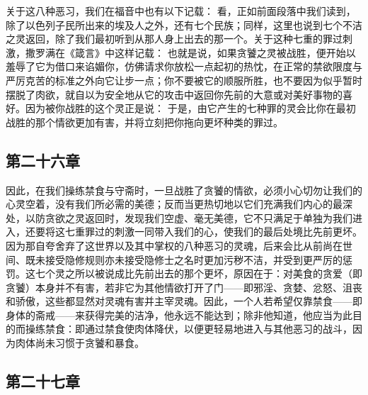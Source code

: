 关于这八种恶习，我们在福音中也有以下记载：  看，正如前面段落中我们读到，除了以色列子民所出来的埃及人之外，还有七个民族；同样，这里也说到七个不洁之灵返回，除了我们最初听到从那人身上出去的那一个。关于这种七重的罪过刺激，撒罗满在《箴言》中这样记载： 也就是说，如果贪饕之灵被战胜，便开始以羞辱了它为借口来谄媚你，仿佛请求你放松一点起初的热忱，在正常的禁欲限度与严厉克苦的标准之外向它让步一点；你不要被它的顺服所胜，也不要因为似乎暂时摆脱了肉欲，就自以为安全地从它的攻击中返回你先前的大意或对美好事物的喜好。因为被你战胜的这个灵正是说： 于是，由它产生的七种罪的灵会比你在最初战胜的那个情欲更加有害，并将立刻把你拖向更坏种类的罪过。\par


\subsection{第二十六章}

\par

因此，在我们操练禁食与守斋时，一旦战胜了贪饕的情欲，必须小心切勿让我们的心灵空着，没有我们所必需的美德；反而当更热切地以它们充满我们内心的最深处，以防贪欲之灵返回时，发现我们空虚、毫无美德，它不只满足于单独为我们进入，还要将这七重罪过的刺激一同带入我们的心，使我们的最后处境比先前更坏。因为那自夸舍弃了这世界以及其中掌权的八种恶习的灵魂，后来会比从前尚在世间、既未接受隐修规则亦未接受隐修士之名时更加污秽不洁，并受到更严厉的惩罚。这七个灵之所以被说成比先前出去的那个更坏，原因在于：对美食的贪爱（即贪饕）本身并不有害，若非它为其他情欲打开了门——即邪淫、贪婪、忿怒、沮丧和骄傲，这些都显然对灵魂有害并主宰灵魂。因此，一个人若希望仅靠禁食——即身体的斋戒——来获得完美的洁净，他永远不能达到；除非他知道，他应当为此目的而操练禁食：即通过禁食使肉体降伏，以便更轻易地进入与其他恶习的战斗，因为肉体尚未习惯于贪饕和暴食。\par


\subsection{第二十七章}

